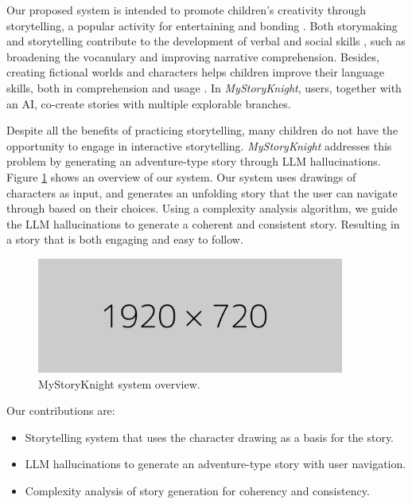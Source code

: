 \documentclass[submit,techrep,english]{ipsj}
\begin{document}
Our proposed system is intended to promote children's creativity through storytelling, a popular activity for entertaining and bonding \cite{7:SunLLL17}. Both storymaking and storytelling contribute to the development of verbal and social skills \cite{9:RyokaiC99,5:CurrinDPCFGH23}, such as broadening the vocanulary and improving  narrative comprehension. Besides, creating fictional worlds and characters helps children improve their language skills, both in comprehension and usage \cite{13:abs-2011-04242}. In \textit{MyStoryKnight}, users, together with an AI, co-create stories with multiple explorable branches.

Despite all the benefits of practicing storytelling, many children do not have the opportunity to engage in interactive storytelling. \textit{MyStoryKnight} addresses this problem by generating an adventure-type story through LLM hallucinations. Figure \ref{fig:system-overview}  shows an overview of our system. Our system uses drawings of characters as input, and generates an unfolding story that the user can navigate through based on their choices. Using a complexity analysis algorithm, we guide the LLM hallucinations to generate a coherent and consistent story. Resulting in a story that is both engaging and easy to follow.

\begin{figure}[t]
    \centering
    \includegraphics[width=0.9\textwidth]{figures/1920x720px.png}
    \caption{MyStoryKnight system overview.}
    \label{fig:system-overview}
\end{figure}

Our contributions are:
\begin{itemize}
    \item Storytelling system that uses the character drawing as a basis for the story.
    \item LLM hallucinations to generate an adventure-type story with user navigation.
    \item Complexity analysis of story generation for coherency and consistency.
\end{itemize}
\end{document}

